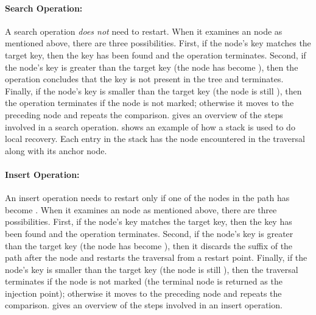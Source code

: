 \paragraph{Search Operation:} 


A search operation \emph{does not} need to restart. When it examines an \myanchor{} node as mentioned above, there are three possibilities. First, if the \myanchor{} node's key matches the target key, then the key has been found and the operation terminates. Second, if the \myanchor{} node's key is greater than the target key (the \myanchor{} node has become \myinconsistent{}), then the operation concludes that the key is not  present in the tree and terminates. Finally, if the \myanchor{} node's key is smaller than the target key (the \myanchor{} node is still \myconsistent{}), then the operation terminates if the node is not marked; otherwise it moves to the preceding \myanchor{} node and repeats the comparison.  gives an overview of the steps involved in a search operation.  shows an example of how a stack is used to do local recovery. Each entry in the stack has the node encountered in the traversal along with its anchor node.



\paragraph{Insert Operation:} 

An insert operation needs to restart only if one of the \myanchor{} nodes in the path has become \myinconsistent{}. When it examines an \myanchor{} node as mentioned above, there are three possibilities. First, if the \myanchor{} node's key matches the target key, then the key has been found and the operation terminates. Second, if the \myanchor{} node's key is greater than the target key (the \myanchor{} node has become \myinconsistent{}), then it discards the suffix of the path after the \myanchor{} node and restarts the traversal from a restart point. Finally, if the \myanchor{} node's key is smaller than the target key (the \myanchor{} node is still \myconsistent{}), then the traversal terminates if the node is not marked (the terminal node is returned  as the injection point); otherwise it moves to the preceding \myanchor{} node and repeats the comparison.  gives an overview of the steps involved in an insert operation.

